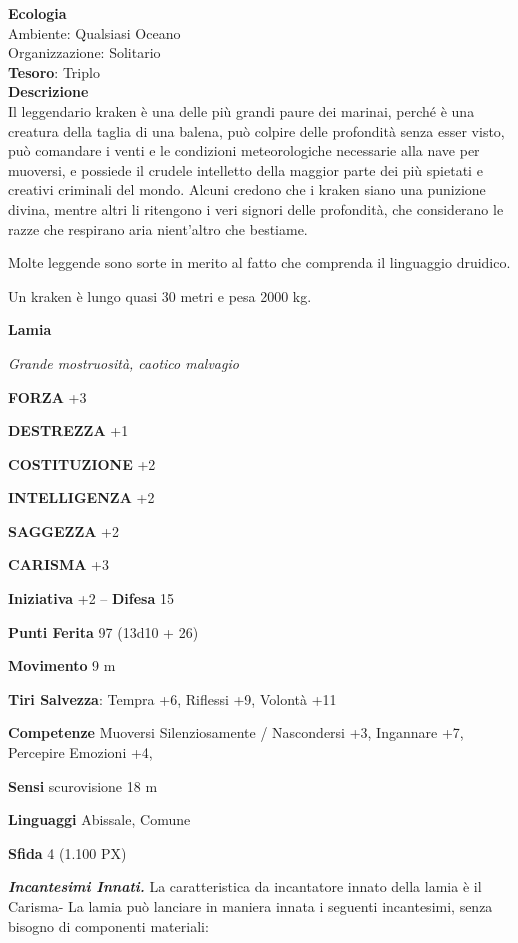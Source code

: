 \begin{multicols}{2}
	\textbf{Ecologia}\\
	Ambiente: Qualsiasi Oceano\\
	Organizzazione: Solitario\\
	\textbf{Tesoro}: Triplo\\
	\textbf{Descrizione}\\
	Il leggendario kraken è una delle più grandi paure dei marinai, perché è una creatura della taglia di una balena, può colpire delle profondità senza esser visto, può comandare i venti e le condizioni meteorologiche necessarie alla nave per muoversi, e possiede il crudele intelletto della maggior parte dei più spietati e creativi criminali del mondo. Alcuni credono che i kraken siano una punizione divina, mentre altri li ritengono i veri signori delle profondità, che considerano le razze che respirano aria nient'altro che bestiame.

	Molte leggende sono sorte in merito al fatto che comprenda il linguaggio druidico.

	Un kraken è lungo quasi 30 metri e pesa 2000 kg.


	\medskip{}\textbf{Lamia}

	\textit{Grande mostruosità, caotico malvagio}

	\textbf{FORZA} +3

	\textbf{DESTREZZA} +1

	\textbf{COSTITUZIONE} +2

	\textbf{INTELLIGENZA} +2

	\textbf{SAGGEZZA} +2

	\textbf{CARISMA} +3

	\textbf{Iniziativa} +2 -- \textbf{Difesa} 15

	\textbf{Punti Ferita} 97 (13d10 + 26)

	\textbf{Movimento} 9 m

	\textbf{Tiri Salvezza}: Tempra +6, Riflessi +9, Volontà +11

	\textbf{Competenze} Muoversi Silenziosamente / Nascondersi +3, Ingannare +7, Percepire Emozioni +4,

	\textbf{Sensi} scurovisione 18 m

	\textbf{Linguaggi} Abissale, Comune

	\textbf{Sfida} 4 (1.100 PX)

	\textit{\textbf{Incantesimi Innati.}} La caratteristica da incantatore innato della lamia è il Carisma- La lamia può lanciare in maniera innata i seguenti incantesimi, senza bisogno di componenti materiali:


\end{multicols}

